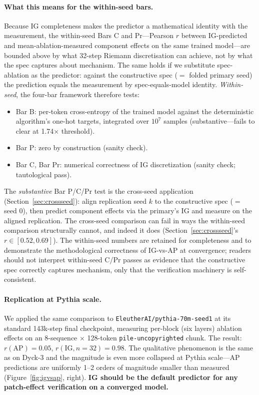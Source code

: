 \documentclass[11pt,letterpaper]{article}
\begin{document}
\paragraph{What this means for the within-seed bars.} Because IG completeness makes the predictor a mathematical identity with the measurement, the within-seed Bars C and Pr---Pearson $r$ between IG-predicted and mean-ablation-measured component effects on the same trained model---are bounded above by what 32-step Riemann discretisation can achieve, not by what the spec captures about mechanism. The same holds if we substitute spec-ablation as the predictor: against the constructive spec ($=$ folded primary seed) the prediction equals the measurement by spec-equals-model identity. \emph{Within-seed}, the four-bar framework therefore tests:
\begin{itemize}[itemsep=2pt,topsep=2pt]
\item Bar B: per-token cross-entropy of the trained model against the deterministic algorithm's one-hot targets, integrated over $10^7$ samples (substantive---fails to clear at 1.74$\times$ threshold).
\item Bar P: zero by construction (sanity check).
\item Bar C, Bar Pr: numerical correctness of IG discretization (sanity check; tautological pass).
\end{itemize}
The \emph{substantive} Bar P/C/Pr test is the cross-seed application (Section~\ref{sec:crossseed}): align replication seed $k$ to the constructive spec ($=$ seed 0), then predict component effects via the primary's IG and measure on the aligned replication. The cross-seed comparison can fail in ways the within-seed comparison structurally cannot, and indeed it does (Section~\ref{sec:crossseed}'s $r \in [0.52, 0.69]$). The within-seed numbers are retained for completeness and to demonstrate the methodological correctness of IG-vs-AP at convergence; readers should not interpret within-seed C/Pr passes as evidence that the constructive spec correctly captures mechanism, only that the verification machinery is self-consistent.

\paragraph{Replication at Pythia scale.} We applied the same comparison to \texttt{EleutherAI/pythia-70m-seed1} at its standard 143k-step final checkpoint, measuring per-block (six layers) ablation effects on an 8-sequence $\times$ 128-token \texttt{pile-uncopyrighted} chunk. The result: $r(\mathrm{AP}) = 0.05$, $r(\mathrm{IG}, n{=}32) = 0.98$. The qualitative phenomenon is the same as on Dyck-3 and the magnitude is even more collapsed at Pythia scale---AP predictions are uniformly 1--2 orders of magnitude smaller than measured (Figure~\ref{fig:igvsap}, right). \textbf{IG should be the default predictor for any patch-effect verification on a converged model.}
\end{document}
